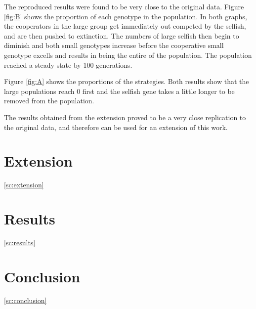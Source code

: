 \documentclass[11pt]{ecsarticle}
\begin{document}
The reproduced results were found to be very close to the original data. 
Figure \ref{fig:B} shows the proportion of each genotype in the population.
In both graphs, the cooperators in the large group get immediately out competed by the selfish, and are then pushed to extinction.
The numbers of large selfish then begin to diminish and both small genotypes increase before the cooperative small genotype excells and results in being the entire of the population.
The population reached a steady state by 100 generations.

Figure \ref{fig:A} shows the proportions of the strategies. 
Both results show that the large populations reach 0 first and the selfish gene takes a little longer to be removed from the population.

The results obtained from the extension proved to be a very close replication to the original data, and therefore can be used for an extension of this work.

\section{Extension}\ref{sc:extension}

\section{Results}\ref{sc:results}

\section{Conclusion}\ref{sc:conclusion}




 
\end{document}
